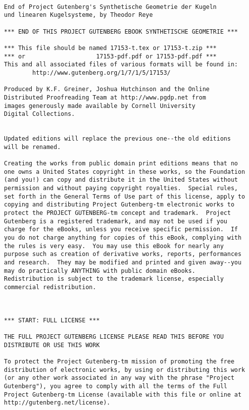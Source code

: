 \newpage

\small
{}
\begin{verbatim}

End of Project Gutenberg's Synthetische Geometrie der Kugeln
und linearen Kugelsysteme, by Theodor Reye

*** END OF THIS PROJECT GUTENBERG EBOOK SYNTHETISCHE GEOMETRIE ***

*** This file should be named 17153-t.tex or 17153-t.zip ***
*** or                    17153-pdf.pdf or 17153-pdf.pdf ***
This and all associated files of various formats will be found in:
        http://www.gutenberg.org/1/7/1/5/17153/

Produced by K.F. Greiner, Joshua Hutchinson and the Online
Distributed Proofreading Team at http://www.pgdp.net from
images generously made available by Cornell University
Digital Collections.


Updated editions will replace the previous one--the old editions
will be renamed.

Creating the works from public domain print editions means that no
one owns a United States copyright in these works, so the Foundation
(and you!) can copy and distribute it in the United States without
permission and without paying copyright royalties.  Special rules,
set forth in the General Terms of Use part of this license, apply to
copying and distributing Project Gutenberg-tm electronic works to
protect the PROJECT GUTENBERG-tm concept and trademark.  Project
Gutenberg is a registered trademark, and may not be used if you
charge for the eBooks, unless you receive specific permission.  If
you do not charge anything for copies of this eBook, complying with
the rules is very easy.  You may use this eBook for nearly any
purpose such as creation of derivative works, reports, performances
and research.  They may be modified and printed and given away--you
may do practically ANYTHING with public domain eBooks.
Redistribution is subject to the trademark license, especially
commercial redistribution.



*** START: FULL LICENSE ***

THE FULL PROJECT GUTENBERG LICENSE PLEASE READ THIS BEFORE YOU
DISTRIBUTE OR USE THIS WORK

To protect the Project Gutenberg-tm mission of promoting the free
distribution of electronic works, by using or distributing this work
(or any other work associated in any way with the phrase "Project
Gutenberg"), you agree to comply with all the terms of the Full
Project Gutenberg-tm License (available with this file or online at
http://gutenberg.net/license).



\end{verbatim}
